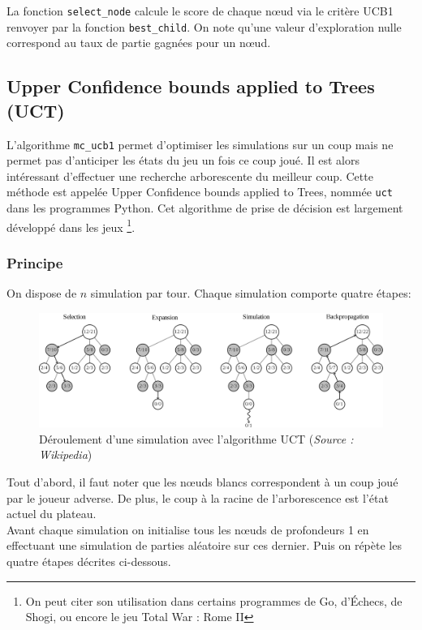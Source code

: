 \documentclass[a4paper]{article}
\theoremstyle{definition}
\begin{document}
La fonction \texttt{select\_node} calcule le score de chaque nœud via le critère UCB1 renvoyer par la fonction  \texttt{best\_child}. On note qu'une valeur d'exploration nulle correspond au taux de partie gagnées pour un nœud.

\subsection{Upper Confidence bounds applied to Trees (UCT)}

L'algorithme \texttt{mc\_ucb1} permet d'optimiser les simulations sur un coup mais ne permet pas d'anticiper les états du jeu un fois ce coup joué. Il est alors intéressant d'effectuer une recherche arborescente du meilleur coup. Cette méthode est appelée Upper Confidence bounds applied to Trees, nommée \texttt{uct} dans les programmes Python. Cet algorithme de prise de décision est largement développé dans les jeux \footnote{On peut citer son utilisation dans certains programmes de Go, d'Échecs, de Shogi, ou encore le jeu Total War : Rome II}.

\subsubsection{Principe}

On dispose de $n$ simulation par tour. Chaque simulation comporte quatre étapes:

\begin{figure}[h]
\centering
\includegraphics[scale=0.18]{MCTS_wikipedia.png}
\caption{Déroulement d'une simulation avec l'algorithme UCT (\textit{Source : Wikipedia})}
\end{figure}

Tout d'abord, il faut noter que les nœuds blancs correspondent à un coup joué par le joueur adverse. De plus, le coup à la racine de l'arborescence est l'état actuel du plateau.\\
Avant chaque simulation on initialise tous les nœuds de profondeurs 1 en effectuant une simulation de parties aléatoire sur ces dernier. Puis on répète les quatre étapes décrites ci-dessous.\\
\end{document}
